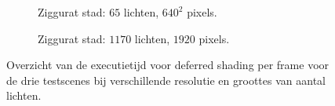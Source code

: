 \begin{figure}[t]
\begin{adjustbox}{minipage=\textwidth, scale=0.6}
\begin{subfigure}[b]{0.83\textwidth}
      \caption{Ziggurat stad: $65$ lichten, $640^2$ pixels.}
      \label{fig:ts-frames-deferred:city-low}
    \end{subfigure}
  \end{adjustbox} %
  \begin{adjustbox}{minipage=\textwidth, scale=0.6}
    \begin{subfigure}[b]{0.83\textwidth}
      \centering
      \def\svgwidth{\textwidth}
      
      \caption{Ziggurat stad: $1170$ lichten, $1920$ pixels.}
      \label{fig:ts-frames-deferred:city-high}
    \end{subfigure}
  \end{adjustbox}
  \caption{Overzicht van de executietijd voor deferred shading per frame voor de
           drie testscenes bij verschillende resolutie en groottes van aantal
           lichten.}
  \label{fig:ts-frames-deferred}
\end{figure}

